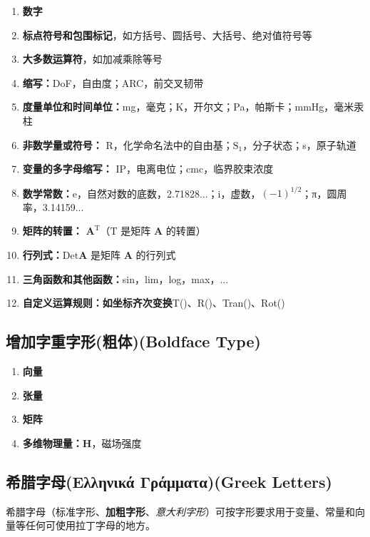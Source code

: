 \begin{enumerate}[label=(\arabic*)]
    \item \textbf{数字}
    \item \textbf{标点符号和包围标记}，如方括号、圆括号、大括号、绝对值符号等
    \item \textbf{大多数运算符}，如加减乘除等号
    \item \textbf{缩写：}DoF，自由度；ARC，前交叉韧带
    \item \textbf{度量单位和时间单位：}mg，毫克；K，开尔文；Pa，帕斯卡；mmHg，毫米汞柱
    \item \textbf{非数学量或符号：} R，化学命名法中的自由基；$\mathrm{S_1}$，分子状态；s，原子轨道
    \item \textbf{变量的多字母缩写：} IP，电离电位；cmc，临界胶束浓度
    \item \textbf{数学常数：}e，自然对数的底数，2.71828...；i，虚数，$(-1)^{1/2}$；π，圆周率，3.14159...
    \item \textbf{矩阵的转置：} $\boldsymbol{A}^\mathrm{T}$（$\mathrm{T}$ 是矩阵 $\boldsymbol{A}$ 的转置）
    \item \textbf{行列式：}$\mathrm{Det} \boldsymbol{A}$ 是矩阵 $\boldsymbol{A}$ 的行列式
    \item \textbf{三角函数和其他函数：}sin，lim，log，max，...
    \item \textbf{自定义运算规则：如坐标齐次变换}T()、R()、Tran()、Rot()
\end{enumerate}

\subsection{\song\textbf{增加字重字形(粗体)(Boldface Type)}}

\begin{enumerate}[label=(\arabic*)]
    \item \textbf{向量}
    \item \textbf{张量}
    \item \textbf{矩阵}
    \item \textbf{多维物理量：}$\mathbf{H}$，磁场强度
\end{enumerate}

\subsection{希腊字母(Ελληνικά Γράμματα)(Greek Letters)}
希腊字母（标准字形、\textbf{加粗字形}、\textit{意大利字形}）可按字形要求用于变量、常量和向量等任何可使用拉丁字母的地方。

